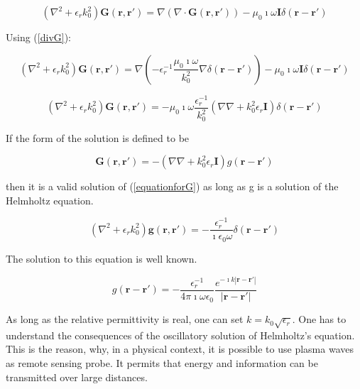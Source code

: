 \documentclass[a4paper,11pt]{thesis}
\begin{document}
\begin{equation}
 \left( \nabla^2  +  \epsilon_r k_0^2  \right)\mathbf{G}(\mathbf{r},\mathbf{r'}) =  \nabla ( \nabla \cdot \mathbf{G} (\mathbf{r},\mathbf{r'}))-\mu_0 \imath \omega \mathbf{I}  \delta (\mathbf{r}-\mathbf{r'})
\end{equation}

Using (\ref{divG}):

\begin{equation}
 \left( \nabla^2  + \epsilon_r  k_0^2  \right)\mathbf{G}(\mathbf{r},\mathbf{r'}) =  \nabla \left(  -\epsilon_r^{-1}\frac{\mu_0 \imath \omega}{k_0^2} \nabla \delta (\mathbf{r}-\mathbf{r'}) \right) - \mu_0 \imath \omega \mathbf{I}  \delta (\mathbf{r}-\mathbf{r'})
\end{equation}

\begin{equation}
 \left( \nabla^2  + \epsilon_r  k_0^2  \right)\mathbf{G}(\mathbf{r},\mathbf{r'}) =  -\mu_0 \imath \omega\frac{\epsilon_r^{-1}}{k_0^2} \left(  \nabla  \nabla   + k_0^2 \epsilon_r \mathbf{I} \right) \delta (\mathbf{r}-\mathbf{r'})\label{equationforG}
\end{equation}

If the form of the solution is defined to be

\begin{equation}
 \mathbf{G}(\mathbf{r},\mathbf{r'}) =  -\left(  \nabla  \nabla   + k_0^2 \epsilon_r \mathbf{I} \right) g(\mathbf{r}-\mathbf{r'})
\end{equation}

then it is a valid solution of (\ref{equationforG}) as long as g is a solution of the  Helmholtz equation.


\begin{equation}
 \left( \nabla^2  + \epsilon_r  k_0^2  \right)\mathbf{g}(\mathbf{r},\mathbf{r'}) =  -\frac{\epsilon_r^{-1}}{\imath \epsilon_0  \omega} \delta (\mathbf{r}-\mathbf{r'})
\end{equation}

The solution to this equation is well known.

\begin{equation}\label{eq:greens_func_vac}
    g(\mathbf{r}-\mathbf{r'})=-\frac{\epsilon_r^{-1}}{4 \pi \imath \omega \epsilon_0} \frac{e^{- \imath k  | \mathbf{r}-\mathbf{r'} |}}{| \mathbf{r}-\mathbf{r'} |}
\end{equation}

As long as the relative permittivity is real, one can set $k=k_0\sqrt{\epsilon_r}$. One has to understand the consequences of the oscillatory solution of Helmholtz's equation. This is the reason, why, in a physical context, it is possible to use plasma waves as remote sensing probe. It permits that energy and information can be transmitted over large distances.
\end{document}
